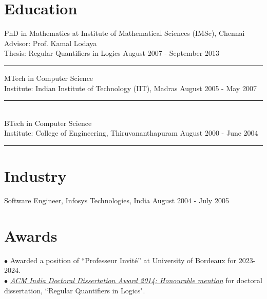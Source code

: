 \documentclass[margin]{res}
\begin{document}
\begin{resume}
\section{Education} 
					PhD in Mathematics at Institute of Mathematical Sciences (IMSc), Chennai  \\
					Advisor: Prof. Kamal Lodaya \\
					Thesis: Regular Quantifiers in Logics  \hfill August 2007 - September 2013\\
					\noindent\rule{13cm}{0.4pt}
					MTech in Computer Science \\
					Institute: Indian Institute of Technology (IIT), Madras \hfill August 2005 - May 2007 \\
					\noindent\rule{13cm}{0.4pt} \\
					BTech in Computer Science  \\
					Institute: College of Engineering, Thiruvananthapuram \hfill August 2000 - June 2004 \\
					\noindent\rule{13cm}{0.4pt} 
	
\section{Industry }
Software Engineer, Infosys Technologies, India \hfill August 2004 - July 2005

\section{Awards}
$\bullet$ Awarded a position of ``Professeur Invit\'e'' at University of Bordeaux for 2023-2024. \\
$\bullet$ \href{http://awards.acm.org/award_winners/sreejith_9923861.cfm}{{\emph{ACM India Doctoral Dissertation Award 2014: Honourable mention}}} for doctoral dissertation, ``Regular Quantifiers in Logics". %



\end{resume}
\end{document}
